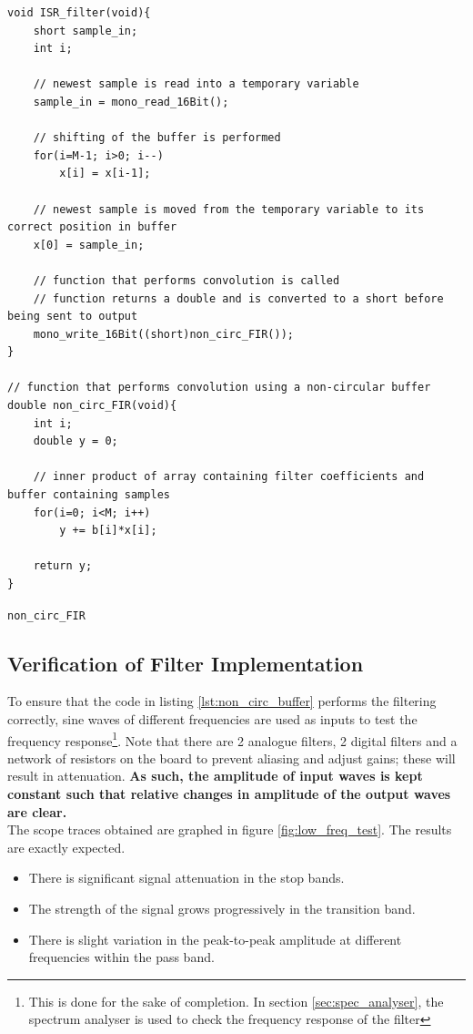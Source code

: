 \documentclass{article}
\begin{document}
\begin{listing}[H]
\begin{verbatim}
void ISR_filter(void){			
    short sample_in;		
    int i;
    
    // newest sample is read into a temporary variable
    sample_in = mono_read_16Bit();		
    		
    // shifting of the buffer is performed
    for(i=M-1; i>0; i--)		
        x[i] = x[i-1];	
    
    // newest sample is moved from the temporary variable to its correct position in buffer
    x[0] = sample_in;
    
    // function that performs convolution is called
    // function returns a double and is converted to a short before being sent to output
    mono_write_16Bit((short)non_circ_FIR());		
}			

// function that performs convolution using a non-circular buffer			
double non_circ_FIR(void){			
    int i;		
    double y = 0;
    
    // inner product of array containing filter coefficients and buffer containing samples
    for(i=0; i<M; i++)
        y += b[i]*x[i];
	
    return y;		
}
\end{verbatim}
\caption{{\tt non\_circ\_FIR}}
\label{lst:non_circ_buffer}
\end{listing}

\subsection{Verification of Filter Implementation}
To ensure that the code in listing \ref{lst:non_circ_buffer} performs the filtering correctly, sine waves of different frequencies are used as inputs to test the frequency response\footnote{This is done for the sake of completion. In section \ref{sec:spec_analyser}, the spectrum analyser is used to check the frequency response of the filter}. Note that there are 2 analogue filters, 2 digital filters and a network of resistors on the board to prevent aliasing and adjust gains; these will result in attenuation.\textbf{ As such, the amplitude of input waves is kept constant such that relative changes in amplitude of the output waves are clear.} \\

The scope traces obtained are graphed in figure \ref{fig:low_freq_test}. The results are exactly expected. 
\begin{itemize}
    \item There is significant signal attenuation in the stop bands.
    \item The strength of the signal grows progressively in the transition band.
    \item There is slight variation in the peak-to-peak amplitude at different frequencies within the pass band. 
\end{itemize}
\end{document}
